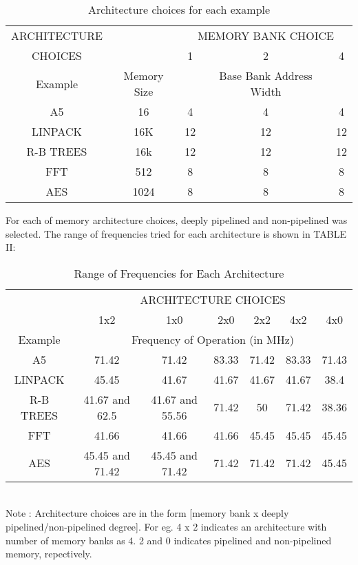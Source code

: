 \begin{table}[t]

\caption{Architecture choices for each example}
\begin{center}
{\begin{tabular}{c  c | c  c  c}
\hline
ARCHITECTURE && \multicolumn{3}{c}{MEMORY BANK CHOICE} \\  
CHOICES && 1& 2& 4 \\ [3ex] 
\hline
Example& Memory Size &&Base Bank Address Width \\ [1ex]
\hline 
A5& 16& 4& 4& 4\\[1ex]
LINPACK& 16K& 12& 12& 12\\[1ex]
R-B TREES& 16k& 12& 12& 12\\[1ex]
FFT& 512& 8& 8& 8\\[1ex]
AES& 1024& 8& 8& 8\\[1ex]
\hline

\end{tabular}}
\label{diffstruc}
\end{center}	
\end{table}

For each of memory architecture choices, deeply pipelined and non-pipelined was selected.
The range of frequencies tried for each architecture is shown in TABLE II:


\begin{table}[t]
\caption{Range of Frequencies for Each Architecture}
\begin{center}
{\begin{tabular}{c | c  c  c  c  c  c}
\hline
 & \multicolumn{6}{c}{ARCHITECTURE CHOICES} \\[1ex]
 &1x2 &1x0 &2x0 &2x2 &4x2 &4x0 \\ [1ex]
\hline
Example& \multicolumn{6}{c}{Frequency of Operation (in MHz)} \\ [1ex]
\hline
A5& 71.42& 71.42& 83.33& 71.42& 83.33& 71.43\\[1ex]
LINPACK& 45.45& 41.67& 41.67& 41.67& 41.67& 38.4\\[1ex]
R-B TREES& 41.67 and 62.5 & 41.67 and 55.56& 71.42& 50& 71.42& 38.36\\[1ex]
FFT& 41.66& 41.66& 41.66& 45.45& 45.45& 45.45\\[1ex]
AES& 45.45 and 71.42& 45.45 and 71.42& 71.42& 71.42& 71.42& 45.45\\[1ex]
\hline

\end{tabular}}
\\[1ex]
Note : Architecture choices are in the form [memory bank x deeply pipelined/non-pipelined degree]. For eg. 4 x 2 indicates an architecture with number of memory banks as 4. 2 and 0 indicates pipelined and non-pipelined memory, repectively.
\label{diffstruc}
\end{center}
\end{table}
